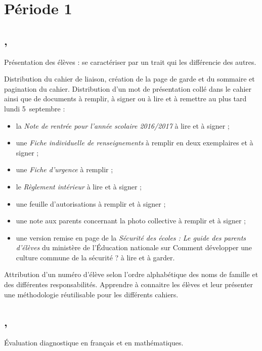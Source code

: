 \documentclass{article}
\begin{document}
\reversemarginpar
\maketitle

\setlength{\parskip}{1ex}

\section{Période 1}
\subsection{\ier{} \sep}
Présentation des élèves : se caractériser par un trait qui les différencie des autres.

Distribution du cahier de liaison, création de la page de garde et du sommaire et pagination du cahier. Distribution d’un mot de présentation collé dans le cahier ainsi que de documents à remplir, à signer ou à lire et à remettre au plus tard lundi 5~septembre :
\begin{itemize}
	\item la \textit{Note de rentrée pour l’année scolaire 2016/2017} à lire et à signer ;
	\item une \textit{Fiche individuelle de renseignements} à remplir en deux exemplaires et à signer ;	
	\item une \textit{Fiche d’urgence} à remplir ;
	\item le \textit{Règlement intérieur} à lire et à signer ;
	\item une feuille d’autorisations à remplir et à signer ;
	\item une note aux parents concernant la photo collective à remplir et à signer ;
	\item une version remise en page de la \textit{Sécurité des écoles : Le guide des
		parents d’élèves} du ministère de l’Éducation nationale sur \og Comment développer une culture commune de la sécurité ? \fg{} à lire et à garder.
\end{itemize}\vspace{1ex}

Attribution d’un numéro d’élève selon l’ordre alphabétique des noms de famille et des différentes responsabilités.
\obj Apprendre à connaitre les élèves et leur présenter une méthodologie réutilisable pour les différents cahiers.


\subsection{ \sep}
Évaluation diagnostique en français et en mathématiques.
\end{document}
